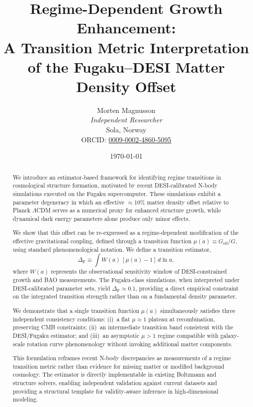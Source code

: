 \documentclass[12pt,a4paper]{article}
\title{\textbf{Regime-Dependent Growth Enhancement:}\\[0.5em]
\large A Transition Metric Interpretation of the Fugaku--DESI Matter Density Offset}
\author{Morten Magnusson\\
\small \textit{Independent Researcher}\\
\small Sola, Norway\\
\small ORCID: \href{https://orcid.org/0009-0002-4860-5095}{0009-0002-4860-5095}}
\date{\today}
\newcommand{\Geff}{G_{\mathrm{eff}}}
\newcommand{\DeltaF}{\Delta_{\mathrm{F}}}
\begin{document}
\maketitle

\begin{abstract}
We introduce an estimator-based framework for identifying regime transitions in cosmological structure formation, motivated by recent DESI-calibrated N-body simulations executed on the Fugaku supercomputer. These simulations exhibit a parameter degeneracy in which an effective $\approx$10\% matter density offset relative to Planck $\Lambda$CDM serves as a numerical proxy for enhanced structure growth, while dynamical dark energy parameters alone produce only minor effects.

We show that this offset can be re-expressed as a regime-dependent modification of the effective gravitational coupling, defined through a transition function $\mu(a) \equiv \Geff/G$, using standard phenomenological notation. We define a transition estimator,
\begin{equation*}
\DeltaF \equiv \int W(a)\,[\mu(a)-1]\,d\ln a,
\end{equation*}
where $W(a)$ represents the observational sensitivity window of DESI-constrained growth and BAO measurements. The Fugaku-class simulations, when interpreted under DESI-calibrated parameter sets, yield $\DeltaF \approx 0.1$, providing a direct empirical constraint on the integrated transition strength rather than on a fundamental density parameter.

We demonstrate that a single transition function $\mu(a)$ simultaneously satisfies three independent consistency conditions: (i)~a flat $\mu \approx 1$ plateau at recombination, preserving CMB constraints; (ii)~an intermediate transition band consistent with the DESI/Fugaku estimator; and (iii)~an asymptotic $\mu > 1$ regime compatible with galaxy-scale rotation curve phenomenology without invoking additional matter components.

This formulation reframes recent N-body discrepancies as measurements of a regime transition metric rather than evidence for missing matter or modified background cosmology. The estimator is directly implementable in existing Boltzmann and structure solvers, enabling independent validation against current datasets and providing a structural template for validity-aware inference in high-dimensional modeling.
\end{abstract}
\end{document}
